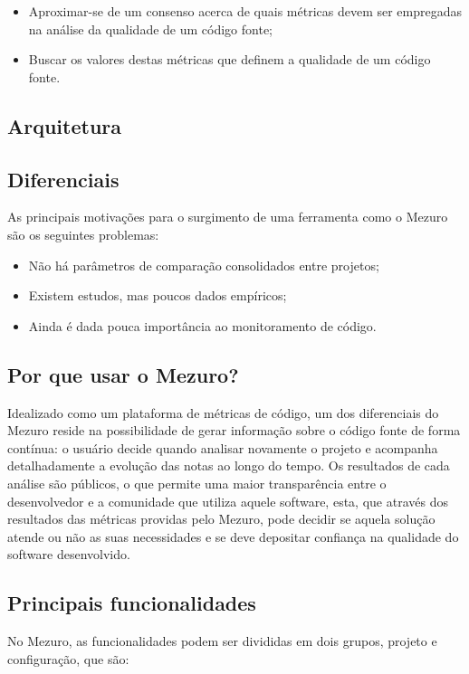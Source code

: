 \documentclass[12pt]{article}
\begin{document}
\begin{itemize}
    \item Aproximar-se de um consenso acerca de quais métricas devem ser empregadas na análise da qualidade de um código fonte;
    \item Buscar os valores destas métricas que definem a qualidade de um código fonte.
\end{itemize}

  \subsection{Arquitetura}

  \subsection{Diferenciais} \label{subsec:motivacao}
  As principais motivações para o surgimento de uma ferramenta como o Mezuro são os seguintes problemas:

  \begin{itemize}
      \item Não há parâmetros de comparação consolidados entre projetos;
      \item Existem estudos, mas poucos dados empíricos;
      \item Ainda é dada pouca importância ao monitoramento de código.
  \end{itemize}

  \subsection{Por que usar o Mezuro?} \label{sec:projeto-mezuro}
  Idealizado como um plataforma de métricas de código, um dos diferenciais do Mezuro reside na possibilidade de gerar informação sobre o código fonte de forma contínua: o usuário decide quando analisar novamente o projeto e acompanha detalhadamente a evolução das notas ao longo do tempo. Os resultados de cada análise são públicos, o que permite uma maior transparência entre o desenvolvedor e a comunidade que utiliza aquele software, esta, que através dos resultados das métricas providas pelo Mezuro, pode decidir se aquela solução atende ou não as suas necessidades e se deve depositar confiança na qualidade do software desenvolvido.

  \subsection{Principais funcionalidades}\label{sec:princ-funcionalidades}
  No Mezuro, as funcionalidades podem ser divididas em dois grupos, projeto e configuração, que são:
\end{document}
